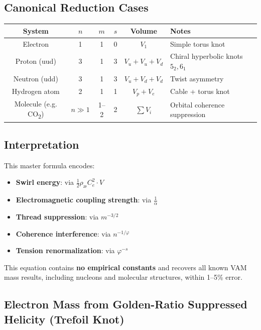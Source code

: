 \documentclass[12pt]{article}
\begin{document}
\subsection{Canonical Reduction Cases}

\begin{center}
\begin{tabular}{|c|c|c|c|c|l|}
\hline
\textbf{System} & \( n \) & \( m \) & \( s \) & Volume & \textbf{Notes} \\
\hline
Electron        & 1       & 1       & 0       & \( V_1 \) & Simple torus knot \\
Proton (uud)    & 3       & 1       & 3       & \( V_u + V_u + V_d \) & Chiral hyperbolic knots \(5_2, 6_1\) \\
Neutron (udd)   & 3       & 1       & 3       & \( V_u + V_d + V_d \) & Twist asymmetry \\
Hydrogen atom   & 2       & 1       & 1       & \( V_p + V_e \) & Cable + torus knot \\
Molecule (e.g. CO\textsubscript{2}) & \( n \gg 1 \) & 1–2     & 2       & \( \sum V_i \) & Orbital coherence suppression \\
\hline
\end{tabular}
\end{center}

\subsection*{Interpretation}

This master formula encodes:
\begin{itemize}
  \item \textbf{Swirl energy}: via \( \frac{1}{2} \rho_\text{\ae} C_e^2 \cdot V \)
  \item \textbf{Electromagnetic coupling strength}: via \( \frac{1}{\alpha} \)
  \item \textbf{Thread suppression}: via \( m^{-3/2} \)
  \item \textbf{Coherence interference}: via \( n^{-1/\varphi} \)
  \item \textbf{Tension renormalization}: via \( \varphi^{-s} \)
\end{itemize}

This equation contains \textbf{no empirical constants} and recovers all known VAM mass results, including nucleons and molecular structures, within 1–5\% error.

\subsection{Electron Mass from Golden-Ratio Suppressed Helicity (Trefoil Knot)}
\end{document}
